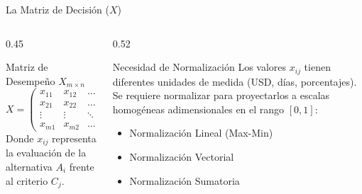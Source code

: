 \documentclass[aspectratio=169, 10pt]{beamer}
\begin{document}
\begin{frame}{La Matriz de Decisión ($X$)}
    \begin{columns}
        \begin{column}{0.45\textwidth}
            \begin{block}{Matriz de Desempeño $X_{m \times n}$}
                \scriptsize
                \begin{equation*}
                    X = 
                    \begin{pmatrix}
                        x_{11} & x_{12} & \dots & x_{1n} \\
                        x_{21} & x_{22} & \dots & x_{2n} \\
                        \vdots & \vdots & \ddots & \vdots \\
                        x_{m1} & x_{m2} & \dots & x_{mn}
                    \end{pmatrix}
                \end{equation*}
                Donde $x_{ij}$ representa la evaluación de la alternativa $A_i$ frente al criterio $C_j$.
            \end{block}
        \end{column}
        
        \begin{column}{0.52\textwidth}
            \begin{exampleblock}{Necesidad de Normalización}
                Los valores $x_{ij}$ tienen diferentes unidades de medida (USD, días, porcentajes). Se requiere normalizar para proyectarlos a escalas homogéneas adimensionales en el rango $[0,1]$:
                \begin{itemize}
                    \item Normalización Lineal (Max-Min)
                    \item Normalización Vectorial
                    \item Normalización Sumatoria
                \end{itemize}
            \end{exampleblock}
        \end{column}
    \end{columns}
\end{frame}
\end{document}
